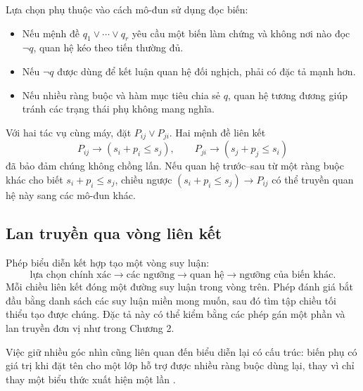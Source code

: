 Lựa chọn phụ thuộc vào cách mô-đun sử dụng đọc biến:

\begin{itemize}
  \item Nếu mệnh đề \(q_1\lor\cdots\lor q_r\) yêu cầu một biến làm chứng và không
  nơi nào đọc \(\neg q\), quan hệ kéo theo tiến thường đủ.
  \item Nếu \(\neg q\) được dùng để kết luận quan hệ đối nghịch, phải có
  đặc tả mạnh hơn.
  \item Nếu nhiều ràng buộc và hàm mục tiêu chia sẻ \(q\), quan hệ tương
  đương giúp
  tránh các trạng thái phụ không mang nghĩa.
\end{itemize}

\begin{example}
Với hai tác vụ cùng máy, đặt \(P_{ij}\lor P_{ji}\). Hai mệnh đề liên kết
\[
  P_{ij}\rightarrow(s_i+p_i\le s_j),
  \qquad
  P_{ji}\rightarrow(s_j+p_j\le s_i)
\]
đã bảo đảm chúng không chồng lấn. Nếu quan hệ trước--sau từ một ràng buộc khác cho
biết \(s_i+p_i\le s_j\), chiều ngược
\((s_i+p_i\le s_j)\rightarrow P_{ij}\) có thể truyền quan hệ này sang các
mô-đun khác.
\end{example}

\subsection{Lan truyền qua vòng liên kết}

Phép biểu diễn kết hợp tạo một vòng suy luận:
\[
  \text{lựa chọn chính xác}
  \rightarrow
  \text{các ngưỡng}
  \rightarrow
  \text{quan hệ}
  \rightarrow
  \text{ngưỡng của biến khác}.
\]
Mỗi chiều liên kết đóng một đường suy luận trong vòng trên. Phép đánh giá bắt
đầu bằng danh sách các suy luận miền mong muốn, sau đó tìm tập chiều tối thiểu
tạo được chúng. Đặc tả này có thể kiểm bằng các phép gán một phần và lan truyền
đơn vị như trong Chương 2.

Việc giữ nhiều góc nhìn cũng liên quan đến biểu diễn lại có cấu trúc: biến phụ có
giá trị khi đặt tên cho một lớp hỗ trợ được nhiều ràng buộc dùng lại, thay
vì chỉ thay một biểu thức xuất hiện một lần
\parencite{haberlandt2023aux}.

